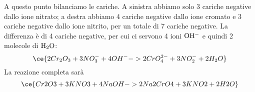 \begin{soluzione}
\begin{equation*}
    \end{equation*}
    A questo punto bilanciamo le cariche. A sinistra abbiamo solo 3 cariche negative dallo ione nitrato; a destra abbiamo 4 cariche negative dallo ione cromato e 3 cariche negative dallo ione nitrito, per un totale di 7 cariche negative. La differenza è di 4 cariche negative, per cui ci servono 4 ioni $\rm OH^-$ e quindi 2 molecole di $\rm H_2O$:
    \begin{equation*}
        \ce{2Cr_2O_3 + 3NO_3^- + 4OH^- -> 2CrO_4^{2-} + 3NO_2^- + 2H_2O}
    \end{equation*}
    La reazione completa sarà
    \begin{equation*}
        \ce{Cr2O3 + 3KNO3 + 4NaOH -> 2Na2CrO4 + 3KNO2 + 2H2O}
    \end{equation*}
\end{soluzione}

\newpage


